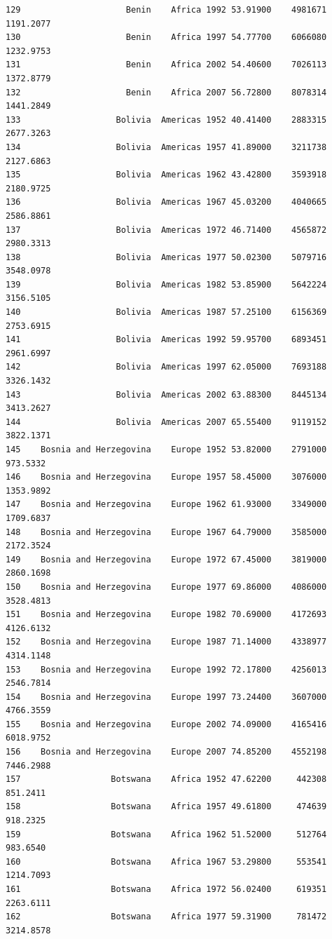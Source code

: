 \documentclass[
  letterpaper,
  DIV=11,
  numbers=noendperiod]{scrreprt}
\begin{document}
\begin{verbatim}
129                     Benin    Africa 1992 53.91900    4981671   1191.2077
130                     Benin    Africa 1997 54.77700    6066080   1232.9753
131                     Benin    Africa 2002 54.40600    7026113   1372.8779
132                     Benin    Africa 2007 56.72800    8078314   1441.2849
133                   Bolivia  Americas 1952 40.41400    2883315   2677.3263
134                   Bolivia  Americas 1957 41.89000    3211738   2127.6863
135                   Bolivia  Americas 1962 43.42800    3593918   2180.9725
136                   Bolivia  Americas 1967 45.03200    4040665   2586.8861
137                   Bolivia  Americas 1972 46.71400    4565872   2980.3313
138                   Bolivia  Americas 1977 50.02300    5079716   3548.0978
139                   Bolivia  Americas 1982 53.85900    5642224   3156.5105
140                   Bolivia  Americas 1987 57.25100    6156369   2753.6915
141                   Bolivia  Americas 1992 59.95700    6893451   2961.6997
142                   Bolivia  Americas 1997 62.05000    7693188   3326.1432
143                   Bolivia  Americas 2002 63.88300    8445134   3413.2627
144                   Bolivia  Americas 2007 65.55400    9119152   3822.1371
145    Bosnia and Herzegovina    Europe 1952 53.82000    2791000    973.5332
146    Bosnia and Herzegovina    Europe 1957 58.45000    3076000   1353.9892
147    Bosnia and Herzegovina    Europe 1962 61.93000    3349000   1709.6837
148    Bosnia and Herzegovina    Europe 1967 64.79000    3585000   2172.3524
149    Bosnia and Herzegovina    Europe 1972 67.45000    3819000   2860.1698
150    Bosnia and Herzegovina    Europe 1977 69.86000    4086000   3528.4813
151    Bosnia and Herzegovina    Europe 1982 70.69000    4172693   4126.6132
152    Bosnia and Herzegovina    Europe 1987 71.14000    4338977   4314.1148
153    Bosnia and Herzegovina    Europe 1992 72.17800    4256013   2546.7814
154    Bosnia and Herzegovina    Europe 1997 73.24400    3607000   4766.3559
155    Bosnia and Herzegovina    Europe 2002 74.09000    4165416   6018.9752
156    Bosnia and Herzegovina    Europe 2007 74.85200    4552198   7446.2988
157                  Botswana    Africa 1952 47.62200     442308    851.2411
158                  Botswana    Africa 1957 49.61800     474639    918.2325
159                  Botswana    Africa 1962 51.52000     512764    983.6540
160                  Botswana    Africa 1967 53.29800     553541   1214.7093
161                  Botswana    Africa 1972 56.02400     619351   2263.6111
162                  Botswana    Africa 1977 59.31900     781472   3214.8578

\end{verbatim}
\end{document}
